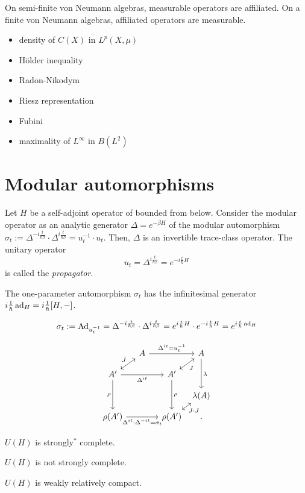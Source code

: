 \documentclass{../../large}
\begin{document}
On semi-finite von Neumann algebras, measurable operators are affiliated.
On a finite von Neumann algebras, affiliated operators are measurable.


\begin{itemize}
\item density of $C(X)$ in $L^p(X,\mu)$
\item H\"older inequality
\item Radon-Nikodym
\item Riesz representation
\item Fubini
\item maximality of $L^\infty$ in $B(L^2)$
\end{itemize}




\section{Modular automorphisms}

\begin{rmk*}
Let $H$ be a self-adjoint operator of bounded from below.
Consider the modular operator as an analytic generator $\Delta=e^{-\beta H}$ of the modular automorphism $\sigma_t:=\Delta^{-i\frac t{\hbar\beta}}\cdot\Delta^{i\frac t{\hbar\beta}}=u_t^{-1}\cdot u_t$.
Then, $\Delta$ is an invertible trace-class operator.
The unitary operator
\[u_t=\Delta^{i\frac t{\hbar\beta}}=e^{-i\frac t\hbar H}\]
is called the \emph{propagator}.


The one-parameter automorphism $\sigma_t$ has the infinitesimal generator $i\frac1\hbar\operatorname{ad}_H=i\frac1\hbar[H,-]$.

\[\sigma_t:=\operatorname{Ad}_{u_t^{-1}}=\Delta^{-i\frac t{\hbar\beta}}\cdot\Delta^{i\frac t{\hbar\beta}}=e^{i\frac t\hbar H}\cdot e^{-i\frac t\hbar H}=e^{i\frac t\hbar\operatorname{ad}_H}\]

\[\begin{tikzcd}[column sep={3.5em,between origins},row sep={2.5em,between origins}]
&A\ar{rr}{\Delta^{it}=u_t^{-1}}&&A\ar{dd}{\lambda}\\
A'\ar[<->]{ur}{J}\ar[swap]{rr}{\Delta^{it}}\ar[swap]{dd}{\rho}&&A'\ar[<->,swap]{ur}{J}\ar{dd}{\rho}&\\
&&&\lambda(A)\\
\rho(A')\ar[swap]{rr}{\Delta^{it}\cdot\Delta^{-it}=\sigma_t}&&\rho(A')\ar[<->,swap]{ur}{J\cdot J}&.
\end{tikzcd}\]
\end{rmk*}


\begin{prb}
\begin{parts}
\item $U(H)$ is strongly$^*$ complete.
\item $U(H)$ is not strongly complete.
\item $U(H)$ is weakly relatively compact.
\end{parts}
\end{prb}
\end{document}
